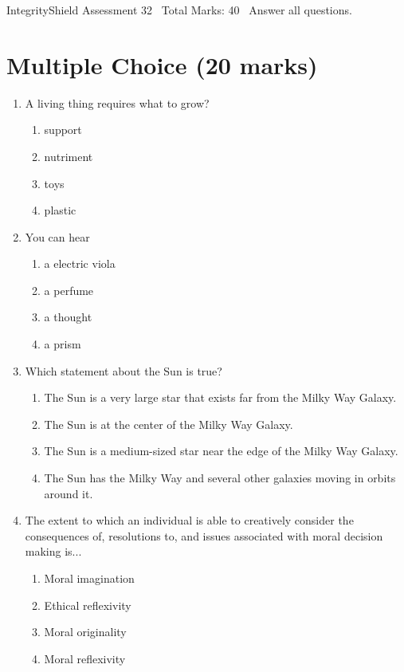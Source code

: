 \documentclass[12pt]{article}
\begin{document}
\begin{center}
IntegrityShield Assessment 32 \
Total Marks: 40 \
Answer all questions.
\end{center}

\section*{Multiple Choice (20 marks)}
\begin{enumerate}[label=\arabic*.]
\item A living thing requires what to grow?
\begin{enumerate}[label=(\alph*)]
    \item support
    \item nutriment
    \item toys
    \item plastic
\end{enumerate}
\item You can hear
\begin{enumerate}[label=(\alph*)]
    \item a electric viola
    \item a perfume
    \item a thought
    \item a prism
\end{enumerate}
\item Which statement about the Sun is true?
\begin{enumerate}[label=(\alph*)]
    \item The Sun is a very large star that exists far from the Milky Way Galaxy.
    \item The Sun is at the center of the Milky Way Galaxy.
    \item The Sun is a medium-sized star near the edge of the Milky Way Galaxy.
    \item The Sun has the Milky Way and several other galaxies moving in orbits around it.
\end{enumerate}
\item The extent to which an individual is able to creatively consider the consequences of, resolutions to, and issues associated with moral decision making is...
\begin{enumerate}[label=(\alph*)]
    \item Moral imagination
    \item Ethical reflexivity
    \item Moral originality
    \item Moral reflexivity

\end{enumerate}
\end{enumerate}
\end{document}
